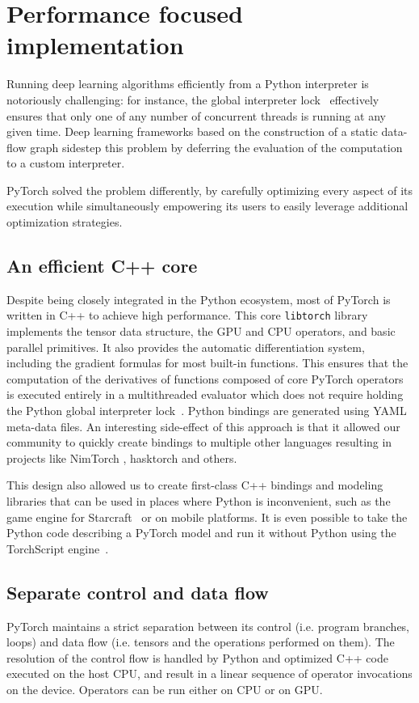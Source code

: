 
\section{Performance focused implementation}

Running deep learning algorithms efficiently from a Python interpreter is notoriously challenging: for instance, the global interpreter lock~\cite{python_gil} effectively ensures that only one of any number of concurrent threads is running at any given time. Deep learning frameworks based on the construction of a static data-flow graph sidestep this problem by deferring the evaluation of the computation to a custom interpreter.

PyTorch solved the problem differently, by carefully optimizing every aspect of its execution while simultaneously empowering its users to easily leverage additional optimization strategies.

\subsection{An efficient C++ core}

Despite being closely integrated in the Python ecosystem, most of PyTorch is written in C++ to achieve high performance. This core \lstinline{libtorch} library implements the tensor data structure, the GPU and CPU operators, and basic parallel primitives. It also provides the automatic differentiation system, including the gradient formulas for most built-in functions. This ensures that the computation of the derivatives of functions composed of core PyTorch operators is executed entirely in a multithreaded evaluator which does not require holding the Python global interpreter lock~\cite{python_gil}. Python bindings are generated using YAML meta-data files.
An interesting side-effect of this approach is that it allowed our community to quickly create bindings to multiple other languages resulting in projects like NimTorch \cite{nimtorch}, hasktorch \cite{hasktorch} and others.

This design also allowed us to create first-class C++ bindings and modeling libraries that can be used in places where Python is inconvenient, such as the game engine for Starcraft~\cite{starcraft_pytorch} or on mobile platforms. It is even possible to take the Python code describing a PyTorch model and run it without Python using the TorchScript engine~\cite{torchscript}. 

\subsection{Separate control and data flow}
PyTorch maintains a strict separation between its control (i.e. program branches, loops) and data flow (i.e. tensors and the operations performed on them). The resolution of the  control flow is handled by Python and optimized C++ code executed on the host CPU, and result in a linear sequence of operator invocations on the device. Operators can be run either on CPU or on GPU.

